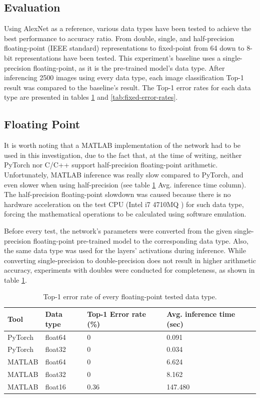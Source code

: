 \subsection{Evaluation}
Using AlexNet as a reference, various data types have been tested to achieve the best performance to accuracy ratio. From double, single, and half-precision floating-point (IEEE standard) representations to fixed-point from 64 down to 8-bit representations have been tested. This experiment's baseline uses a single-precision floating-point, as it is the pre-trained model's data type. After inferencing 2500 images using every data type, each image classification Top-1 result was compared to the baseline's result. The Top-1 error rates for each data type are presented in tables \ref{tab:floats-error-rates} and \ref{tab:fixed-error-rates}.

\subsection{Floating Point}
It is worth noting that a MATLAB implementation of the network had to be used in this investigation, due to the fact that, at the time of writing, neither PyTorch nor C/C++ support half-precision floating-point arithmetic. Unfortunately, MATLAB inference was really slow compared to PyTorch, and even slower when using half-precision (see table \ref{tab:floats-error-rates} Avg. inference time column). The half-precision floating-point slowdown was caused because there is no hardware acceleration on the test CPU (Intel i7 4710MQ \cite{Intel-i7-4710MQ-Processor}) for such data type, forcing the mathematical operations to be calculated using software emulation.

Before every test, the network's parameters were converted from the given single-precision floating-point pre-trained model to the corresponding data type. Also, the same data type was used for the layers' activations during inference. While converting single-precision to double-precision does not result in higher arithmetic accuracy, experiments with doubles were conducted for completeness, as shown in table \ref{tab:floats-error-rates}.

\begin{table}[H]
	\caption{Top-1 error rate of every floating-point tested data type.}
	\label{tab:floats-error-rates}
	\centering
	\begin{tabular}{p{2cm} p{2cm} p{3cm} p{3cm}}
		\toprule
		\textbf{Tool} & \textbf{Data type} & \textbf{Top-1 Error rate (\%)} & \textbf{Avg. inference time (sec)} \\
		\midrule
			PyTorch & float64	& 0			& 0.091 \\
			PyTorch & float32	& 0			& 0.034 \\
			MATLAB 	& float64	& 0			& 6.624 \\
			MATLAB 	& float32	& 0			& 8.162 \\
			MATLAB 	& float16 	& 0.36  	& 147.480 \\
		\bottomrule
	\end{tabular}
\end{table}

